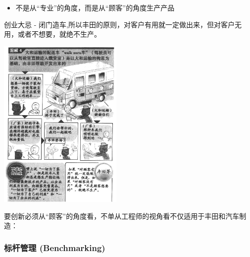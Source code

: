 \begin{itemize}
\tightlist
\item
  不是从``专业''的角度，而是从``顾客''的角度生产产品
\end{itemize}

\begin{description}
\tightlist
\item[]
创业大忌 -
闭门造车,所以丰田的原则，对客户有用就一定做出来，但对客户无用，或者不想要，就绝不生产。\\
\end{description}


\includegraphics[width=6cm]{丰田p3.png}

要创新必须从``顾客''的角度看，不单从工程师的视角看不仅适用于丰田和汽车制造：


\hypertarget{ux6807ux6746ux7ba1ux7406-benchmarking}{%
\subsubsection{标杆管理
(Benchmarking)}\label{ux6807ux6746ux7ba1ux7406-benchmarking}}

